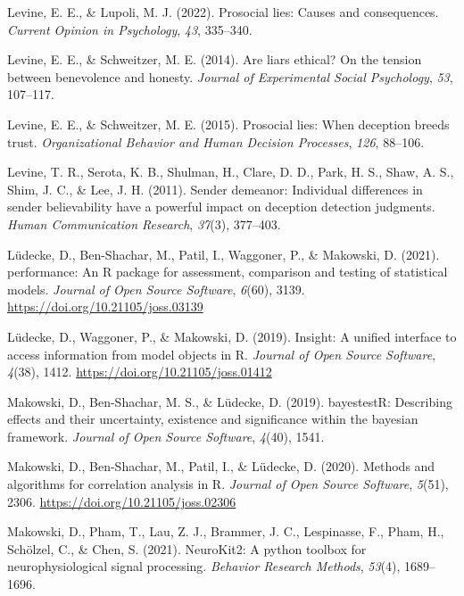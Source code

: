 \documentclass[
  man,mask,floatsintext]{apa6}
\newlength{\cslhangindent}
\newlength{\cslentryspacingunit} %
\newenvironment{CSLReferences}[2] %
 {%
  \setlength{\parindent}{0pt}
  \ifodd #1
  \let\oldpar\par
  \def\par{\hangindent=\cslhangindent\oldpar}
  \fi
  \setlength{\parskip}{#2\cslentryspacingunit}
 }%
 {}
\begin{document}
\begin{CSLReferences}{1}{0}
\leavevmode{}%
Levine, E. E., \& Lupoli, M. J. (2022). Prosocial lies: Causes and consequences. \emph{Current Opinion in Psychology}, \emph{43}, 335--340.

\leavevmode{}%
Levine, E. E., \& Schweitzer, M. E. (2014). Are liars ethical? On the tension between benevolence and honesty. \emph{Journal of Experimental Social Psychology}, \emph{53}, 107--117.

\leavevmode{}%
Levine, E. E., \& Schweitzer, M. E. (2015). Prosocial lies: When deception breeds trust. \emph{Organizational Behavior and Human Decision Processes}, \emph{126}, 88--106.

\leavevmode{}%
Levine, T. R., Serota, K. B., Shulman, H., Clare, D. D., Park, H. S., Shaw, A. S., Shim, J. C., \& Lee, J. H. (2011). Sender demeanor: Individual differences in sender believability have a powerful impact on deception detection judgments. \emph{Human Communication Research}, \emph{37}(3), 377--403.

\leavevmode{}%
Lüdecke, D., Ben-Shachar, M., Patil, I., Waggoner, P., \& Makowski, D. (2021). {performance}: An {R} package for assessment, comparison and testing of statistical models. \emph{Journal of Open Source Software}, \emph{6}(60), 3139. \url{https://doi.org/10.21105/joss.03139}

\leavevmode{}%
Lüdecke, D., Waggoner, P., \& Makowski, D. (2019). Insight: A unified interface to access information from model objects in {R}. \emph{Journal of Open Source Software}, \emph{4}(38), 1412. \url{https://doi.org/10.21105/joss.01412}

\leavevmode{}%
Makowski, D., Ben-Shachar, M. S., \& Lüdecke, D. (2019). bayestestR: Describing effects and their uncertainty, existence and significance within the bayesian framework. \emph{Journal of Open Source Software}, \emph{4}(40), 1541.

\leavevmode{}%
Makowski, D., Ben-Shachar, M., Patil, I., \& Lüdecke, D. (2020). Methods and algorithms for correlation analysis in {R}. \emph{Journal of Open Source Software}, \emph{5}(51), 2306. \url{https://doi.org/10.21105/joss.02306}

\leavevmode{}%
Makowski, D., Pham, T., Lau, Z. J., Brammer, J. C., Lespinasse, F., Pham, H., Schölzel, C., \& Chen, S. (2021). NeuroKit2: A python toolbox for neurophysiological signal processing. \emph{Behavior Research Methods}, \emph{53}(4), 1689--1696.


\end{CSLReferences}
\end{document}
